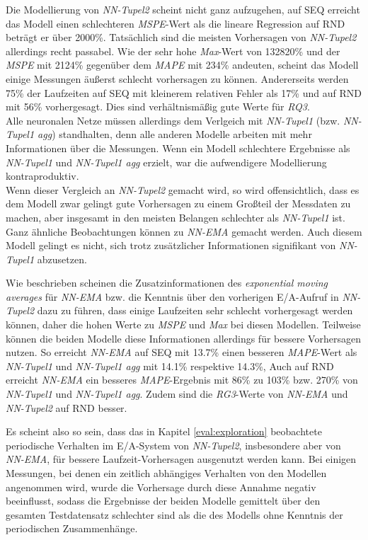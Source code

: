 \documentclass[
	12pt,
	a4paper,
	BCOR10mm,
	DIV14,
	listof=totoc,
	bibliography=totoc,
	headsepline
]{scrreprt}
\begin{document}
Die Modellierung von \textit{NN-Tupel2} scheint nicht ganz aufzugehen, auf SEQ erreicht das Modell einen schlechteren \textit{MSPE}-Wert als die lineare Regression auf RND beträgt er über 2000\%.
Tatsächlich sind die meisten Vorhersagen von \textit{NN-Tupel2} allerdings recht passabel.
Wie der sehr hohe \textit{Max}-Wert von 132820\% und der \textit{MSPE} mit 2124\% gegenüber dem \textit{MAPE} mit 234\% andeuten, scheint das Modell einige Messungen äußerst schlecht vorhersagen zu können.
Andererseits werden 75\% der Laufzeiten auf SEQ mit kleinerem relativen Fehler als 17\% und auf RND mit 56\% vorhergesagt. Dies sind verhältnismäßig gute Werte für \textit{RQ3}.\\
Alle neuronalen Netze müssen allerdings dem Verlgeich mit \textit{NN-Tupel1} (bzw. \textit{NN-Tupel1 agg}) standhalten, denn alle anderen Modelle arbeiten mit mehr Informationen über die Messungen.
Wenn ein Modell schlechtere Ergebnisse als \textit{NN-Tupel1} und \textit{NN-Tupel1 agg} erzielt, war die aufwendigere Modellierung kontraproduktiv.\\
Wenn dieser Vergleich an \textit{NN-Tupel2} gemacht wird, so wird offensichtlich, dass es dem Modell zwar gelingt gute Vorhersagen zu einem Großteil der Messdaten zu machen, aber insgesamt in den meisten Belangen schlechter als \textit{NN-Tupel1} ist.\\
Ganz ähnliche Beobachtungen können zu \textit{NN-EMA} gemacht werden.
Auch diesem Modell gelingt es nicht, sich trotz zusätzlicher Informationen signifikant von \textit{NN-Tupel1} abzusetzen.\medskip

Wie beschrieben scheinen die Zusatzinformationen des \textit{exponential moving averages} für \textit{NN-EMA} bzw. die Kenntnis über den vorherigen E/A-Aufruf in \textit{NN-Tupel2} dazu zu führen, dass einige Laufzeiten sehr schlecht vorhergesagt werden können, daher die hohen Werte zu \textit{MSPE} und \textit{Max} bei diesen Modellen.
Teilweise können die beiden Modelle diese Informationen allerdings für bessere Vorhersagen nutzen. So erreicht \textit{NN-EMA} auf SEQ mit 13.7\% einen besseren \textit{MAPE}-Wert als \textit{NN-Tupel1} und \textit{NN-Tupel1 agg} mit 14.1\% respektive 14.3\%, 
Auch auf RND erreicht \textit{NN-EMA} ein besseres \textit{MAPE}-Ergebnis mit 86\% zu 103\% bzw. 270\% von \textit{NN-Tupel1} und \textit{NN-Tupel1 agg}.
Zudem sind die \textit{RG3}-Werte von \textit{NN-EMA} und \textit{NN-Tupel2} auf RND besser.\medskip

Es scheint also so sein, dass das in Kapitel \ref{eval:exploration} beobachtete periodische Verhalten im E/A-System von \textit{NN-Tupel2}, insbesondere aber von \textit{NN-EMA}, für bessere Laufzeit-Vorhersagen ausgenutzt werden kann.
Bei einigen Messungen, bei denen ein zeitlich abhängiges Verhalten von den Modellen angenommen wird, wurde die Vorhersage durch diese Annahme negativ beeinflusst, sodass die Ergebnisse der beiden Modelle gemittelt über den gesamten Testdatensatz schlechter sind als die des Modells ohne Kenntnis der periodischen Zusammenhänge.
\end{document}
